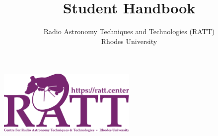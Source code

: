 \documentclass[12pt]{article}
\title{Student Handbook}
\author{Radio Astronomy Techniques and Technologies (RATT)\\Rhodes University}
\date{\year}
\begin{document}
\includegraphics[width=0.5\textwidth]{logos/ratt-logo.png}

\maketitle

\newpage
\end{document}
